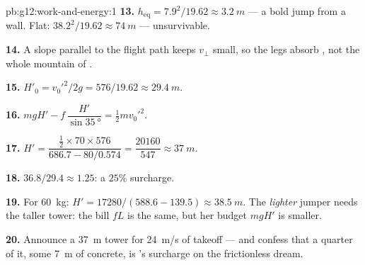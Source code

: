 \begin{solution}{pb:g12:work-and-energy:1}
\textbf{13.} $h_{\text{eq}} = 7.9^2/19.62 \approx \qty{3.2}{m}$ ---
a bold jump from a wall. Flat: $38.2^2/19.62 \approx \qty{74}{m}$ ---
unsurvivable.

\textbf{14.} A slope parallel to the flight path keeps $v_\perp$
small, so the legs absorb , not the whole mountain of .

\textbf{15.} $H'_0 = v_0'^2/2g = 576/19.62 \approx \qty{29.4}{m}$.

\textbf{16.} $mgH' - f\,\dfrac{H'}{\sin\qty{35}{\degree}} =
\tfrac12 m v_0'^2$.

\textbf{17.} $H' = \dfrac{\tfrac12 \times 70 \times 576}
{686.7 - 80/0.574} = \dfrac{\num{20160}}{547} \approx \qty{37}{m}$.

\textbf{18.} $36.8/29.4 \approx 1.25$: a $25\%$ surcharge.

\textbf{19.} For \qty{60}{kg}: $H' = \num{17280}/(588.6 - 139.5)
\approx \qty{38.5}{m}$. The \emph{lighter} jumper needs the taller
tower: the  bill $fL$ is the same, but her  budget
$mgH'$ is smaller.

\textbf{20.} Announce a \qty{37}{m} tower for \qty{24}{m/s} of
takeoff --- and confess that a quarter of it, some \qty{7}{m} of
concrete, is 's surcharge on the frictionless dream.
\end{solution}
